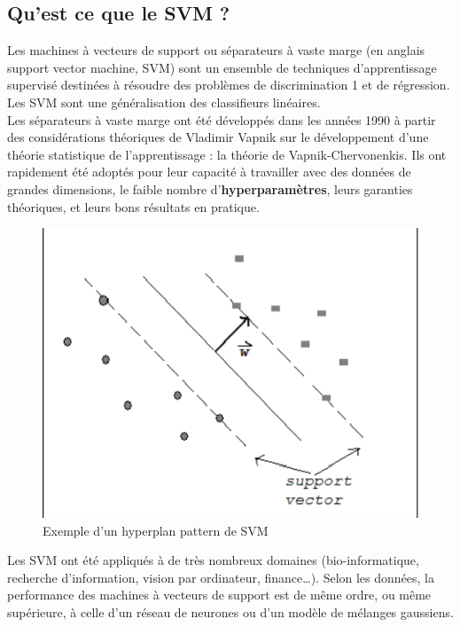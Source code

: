 \subsection{Qu'est ce que le SVM ?}
Les machines à vecteurs de support ou séparateurs à vaste marge (en anglais support vector machine, SVM) sont un ensemble de techniques d'apprentissage supervisé destinées à résoudre des problèmes de discrimination 1 et de régression. Les SVM sont une généralisation des classifieurs linéaires.\\[0.5cm]
Les séparateurs à vaste marge ont été développés dans les années 1990 à partir des considérations théoriques de Vladimir Vapnik sur le développement d'une théorie statistique de l'apprentissage : la théorie de Vapnik-Chervonenkis. Ils ont rapidement été adoptés pour leur capacité à travailler avec des données de grandes dimensions, le faible nombre d'\textbf{hyperparamètres}, leurs garanties théoriques, et leurs bons résultats en pratique.\\[0.5cm]
\begin{figure}[H]
	\begin{center}
	\includegraphics[scale=0.5]{Images/ex_svm.png}
	\end{center}
	\caption{Exemple d'un hyperplan pattern de SVM}
	\label{fig:svm0}
\end{figure}
Les SVM ont été appliqués à de très nombreux domaines (bio-informatique, recherche d'information, vision par ordinateur, finance…). Selon les données, la performance des machines à vecteurs de support est de même ordre, ou même supérieure, à celle d'un réseau de neurones ou d'un modèle de mélanges gaussiens.\\[1cm]
